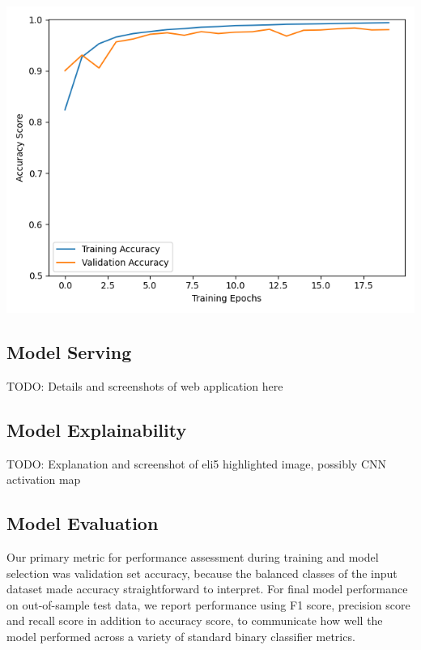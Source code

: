 \documentclass[11pt, letterpaper]{article}
\newenvironment{Figure}
  {\par\medskip\noindent\minipage{\linewidth}}
  {\endminipage\par\medskip}
\begin{document}
\begin{multicols}{2}
  \begin{Figure}
    \centering
    \includegraphics[width=1.0\textwidth]{figures/learning-curve-vgg10-dlib-hflip-rgb-combined-125-0001.png}
    \label{learning-curve-vgg10-rgb-combined}
  \end{Figure}


  \subsection{Model Serving}

  TODO: Details and screenshots of web application here

  \subsection{Model Explainability}

  TODO: Explanation and screenshot of eli5 highlighted image, possibly CNN
  activation map

  \subsection{Model Evaluation}

  Our primary metric for performance assessment during training and
  model selection was validation set accuracy, because the balanced
  classes of the input dataset made accuracy straightforward to
  interpret. For final model performance on out-of-sample test data,
  we report performance using F1 score, precision score and recall
  score in addition to accuracy score, to communicate how well the
  model performed across a variety of standard binary classifier
  metrics.


\end{multicols}
\end{document}
